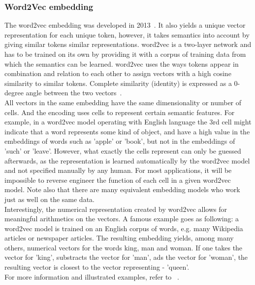 \documentclass[
	a4paper,
	pagesize,
	pdftex,
	12pt,
	twoside, %
	BCOR=5mm, %
	ngerman,
	fleqn,
	final,
	]{scrartcl}
\begin{document}
\subsubsection{Word2Vec embedding}
The word2vec embedding was developed in 2013~\cite{Mikolov.2013}. It also yields a unique vector representation for each unique token, however, it takes semantics into account by giving similar tokens similar representations. word2vec is a two-layer network and has to be trained on its own by providing it with a corpus of training data from which the semantics can be learned. word2vec uses the ways tokens appear in combination and relation to each other to assign vectors with a high cosine similarity to similar tokens. Complete similarity (identity) is expressed as a 0-degree angle between the two vectors~\cite{Liu.2018}.\\
All vectors in the same embedding have the same dimensionality or number of cells. And the encoding uses cells to represent certain semantic features. For example, in a word2vec model operating with English language the 3rd cell might indicate that a word represents some kind of object, and have a high value in the embeddings of words such as 'apple' or 'book', but not in the embeddings of 'such' or 'leave'. However, what exactly the cells represent can only be guessed afterwards, as the representation is learned automatically by the word2vec model and not specified manually by any human. For most applications, it will be impossible to reverse engineer the function of each cell in a given word2vec model. Note also that there are many equivalent embedding models who work just as well on the same data.\\ 
Interestingly, the numerical representation created by word2vec allows for meaningful arithmetics on the vectors. A famous example goes as following: a word2vec model is trained on an English corpus of words, e.g. many Wikipedia articles or newspaper articles. The resulting embedding yields, among many others, numerical vectors for the words king, man and woman. If one takes the vector for 'king', substracts the vector for 'man', ads the vector for 'woman', the resulting vector is closest to the vector representing - 'queen'.\\
For more information and illustrated examples, refer to ~\cite{Word2Vec}.
\end{document}

